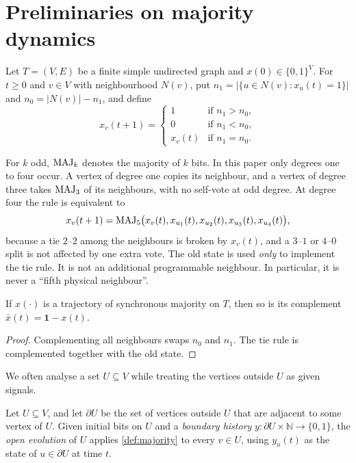 \section{Preliminaries on majority dynamics}\label{sec:prelim}

\begin{definition}\label{def:majority}
Let $T=(V,E)$ be a finite simple undirected graph and $x(0)\in\{0,1\}^V$. For $t\ge 0$ and $v\in V$
with neighbourhood $N(v)$, put $n_1=|\{u\in N(v):x_u(t)=1\}|$ and $n_0=|N(v)|-n_1$, and define
\[
x_v(t+1)=\begin{cases}1&\text{if } n_1>n_0,\\ 0&\text{if } n_1<n_0,\\ x_v(t)&\text{if } n_1=n_0.\end{cases}
\]
\end{definition}

For $k$ odd, $\operatorname{MAJ}_k$ denotes the majority of $k$ bits. In this paper only degrees one to four occur.
A vertex of degree one copies its neighbour, and a vertex of degree three takes $\operatorname{MAJ}_3$ of its
neighbours, with no self-vote at odd degree. At degree four the rule is equivalent to
\begin{equation}\label{eq:maj5}
x_v(t+1)=\operatorname{MAJ}_5\bigl(x_v(t),x_{u_1}(t),x_{u_2}(t),x_{u_3}(t),x_{u_4}(t)\bigr),
\end{equation}
because a tie $2$--$2$ among the neighbours is broken by $x_v(t)$, and a $3$--$1$ or $4$--$0$ split
is not affected by one extra vote. The old state is used \emph{only} to implement the tie rule. It is
not an additional programmable neighbour. In particular, it is never a ``fifth physical
neighbour''.

\begin{lemma}\label{lem:selfdual}
If $x(\cdot)$ is a trajectory of synchronous majority on $T$, then so is its complement
$\bar x(t)=\mathbf 1-x(t)$.
\end{lemma}

\begin{proof}
Complementing all neighbours swaps $n_0$ and $n_1$. The tie rule is complemented together with the
old state.
\end{proof}

We often analyse a set $U\subseteq V$ while treating the vertices outside $U$ as given signals.

\begin{definition}\label{def:open}
Let $U\subseteq V$, and let $\partial U$ be the set of vertices outside $U$ that are adjacent to
some vertex of $U$. Given initial bits on $U$ and a \emph{boundary history} $y:\partial U\times\mathbb N\to\{0,1\}$,
the \emph{open evolution} of $U$ applies \cref{def:majority} to every $v\in U$, using $y_u(t)$ as the
state of $u\in\partial U$ at time $t$.
\end{definition}

